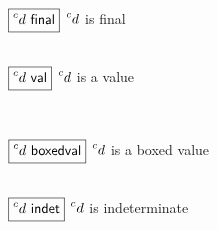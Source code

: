 \documentclass[index.tex]{subfiles}
\begin{document}
\begin{figure}[htb!]
  \begin{multicols}{2}
    $\judgbox{\isFinal{\IEMV}}$ $\IEMV$ is final
    
    \begin{mathpar}
    
    \end{mathpar} \\
    
    $\judgbox{\isVal{\IEMV}}$ $\IEMV$ is a value
    
    \begin{mathpar}
    
    \end{mathpar} \\
  \end{multicols}

  $\judgbox{\isBoxedVal{\IEMV}}$ $\IEMV$ is a boxed value

  \begin{mathpar}


  \end{mathpar} \\

  $\judgbox{\isIndet{\IEMV}}$ $\IEMV$ is indeterminate

  \begin{mathpar}




\end{mathpar}
\end{figure}
\end{document}
